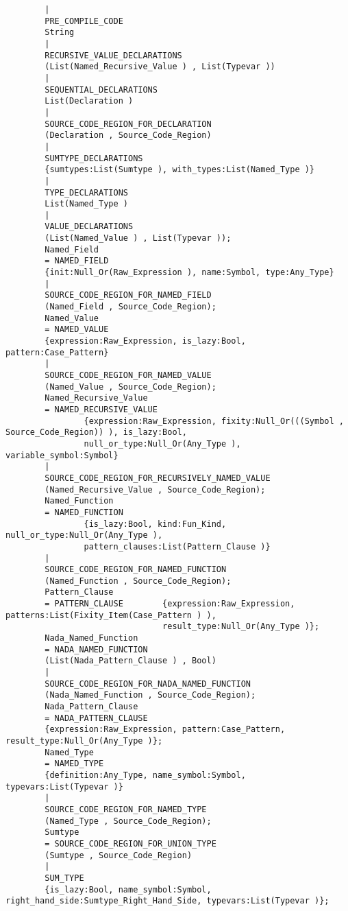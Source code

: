 \begin{verbatim}
        |
        PRE_COMPILE_CODE
        String
        |
        RECURSIVE_VALUE_DECLARATIONS
        (List(Named_Recursive_Value ) , List(Typevar ))
        |
        SEQUENTIAL_DECLARATIONS
        List(Declaration )
        |
        SOURCE_CODE_REGION_FOR_DECLARATION
        (Declaration , Source_Code_Region)
        |
        SUMTYPE_DECLARATIONS
        {sumtypes:List(Sumtype ), with_types:List(Named_Type )}
        |
        TYPE_DECLARATIONS
        List(Named_Type )
        |
        VALUE_DECLARATIONS
        (List(Named_Value ) , List(Typevar ));
        Named_Field
        = NAMED_FIELD
        {init:Null_Or(Raw_Expression ), name:Symbol, type:Any_Type}
        |
        SOURCE_CODE_REGION_FOR_NAMED_FIELD
        (Named_Field , Source_Code_Region);
        Named_Value
        = NAMED_VALUE
        {expression:Raw_Expression, is_lazy:Bool, pattern:Case_Pattern}
        |
        SOURCE_CODE_REGION_FOR_NAMED_VALUE
        (Named_Value , Source_Code_Region);
        Named_Recursive_Value
        = NAMED_RECURSIVE_VALUE
                {expression:Raw_Expression, fixity:Null_Or(((Symbol , Source_Code_Region)) ), is_lazy:Bool,
                null_or_type:Null_Or(Any_Type ), variable_symbol:Symbol}
        |
        SOURCE_CODE_REGION_FOR_RECURSIVELY_NAMED_VALUE
        (Named_Recursive_Value , Source_Code_Region);
        Named_Function
        = NAMED_FUNCTION
                {is_lazy:Bool, kind:Fun_Kind, null_or_type:Null_Or(Any_Type ),
                pattern_clauses:List(Pattern_Clause )}
        |
        SOURCE_CODE_REGION_FOR_NAMED_FUNCTION
        (Named_Function , Source_Code_Region);
        Pattern_Clause
        = PATTERN_CLAUSE        {expression:Raw_Expression, patterns:List(Fixity_Item(Case_Pattern ) ),
                                result_type:Null_Or(Any_Type )};
        Nada_Named_Function
        = NADA_NAMED_FUNCTION
        (List(Nada_Pattern_Clause ) , Bool)
        |
        SOURCE_CODE_REGION_FOR_NADA_NAMED_FUNCTION
        (Nada_Named_Function , Source_Code_Region);
        Nada_Pattern_Clause
        = NADA_PATTERN_CLAUSE
        {expression:Raw_Expression, pattern:Case_Pattern, result_type:Null_Or(Any_Type )};
        Named_Type
        = NAMED_TYPE
        {definition:Any_Type, name_symbol:Symbol, typevars:List(Typevar )}
        |
        SOURCE_CODE_REGION_FOR_NAMED_TYPE
        (Named_Type , Source_Code_Region);
        Sumtype
        = SOURCE_CODE_REGION_FOR_UNION_TYPE
        (Sumtype , Source_Code_Region)
        |
        SUM_TYPE
        {is_lazy:Bool, name_symbol:Symbol, right_hand_side:Sumtype_Right_Hand_Side, typevars:List(Typevar )};

\end{verbatim}
